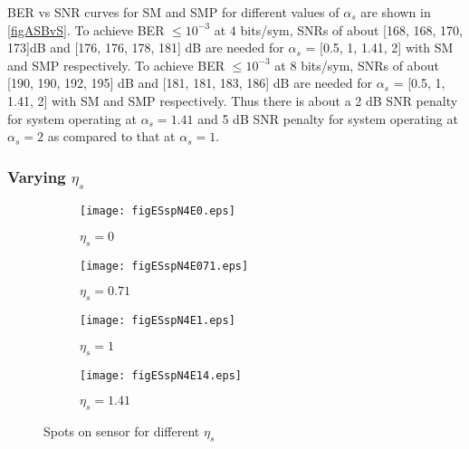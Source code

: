 BER vs SNR curves for SM and SMP for different values of $\alpha_{s}$ are shown in \figurename{ \ref{figASBvS}}. To achieve BER $\leq10^{-3}$ at 4 bits/sym, SNRs of about [168, 168, 170, 173]dB and [176, 176, 178, 181] dB are needed for $\alpha_{s}$ = [0.5, 1, 1.41, 2]  with SM and SMP respectively. To achieve BER $\leq10^{-3}$ at 8 bits/sym, SNRs of about [190, 190, 192, 195] dB and [181, 181, 183, 186] dB are needed for $\alpha_{s}$ = [0.5, 1, 1.41, 2] with SM and SMP respectively. Thus there is about a 2 dB SNR penalty for system operating at $\alpha_{s}=1.41$ and 5 dB SNR penalty for system operating at $\alpha_{s}=2$ as compared to that at $\alpha_{s}=1$.

\subsubsection{Varying $\eta_{s}$}
\label{subsubsec:osmResultsEta}
\begin{figure}[!t]
	\centering
		\begin{subfigure}{0.49\textwidth}
			\centering
			\texttt{[image: figESspN4E0.eps]}
			\caption{$\eta_{s}=0$}
			\label{figESspN4E0}
		\end{subfigure}
		\hfill
		\begin{subfigure}{0.49\textwidth}
			\centering
			\texttt{[image: figESspN4E071.eps]}
			\caption{$\eta_{s}=0.71$}
			\label{figESspN4E071}
		\end{subfigure}
		\vfill
		\begin{subfigure}{0.49\textwidth}
			\centering
			\texttt{[image: figESspN4E1.eps]}
			\caption{$\eta_{s}=1$}
			\label{figESspN4E1}
		\end{subfigure}
		\hfill
		\begin{subfigure}{0.49\textwidth}
			\centering
			\texttt{[image: figESspN4E14.eps]}
			\caption{$\eta_{s}=1.41$}
			\label{figESspN4E14}
		\end{subfigure}
		
		\caption{Spots on sensor for different $\eta_{s}$}
		\label{figESSpots}
\end{figure}


